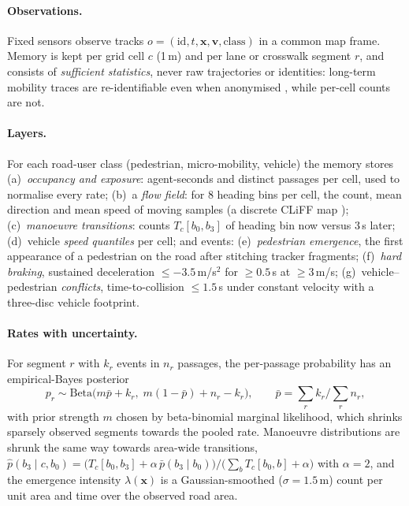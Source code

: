 \documentclass[11pt,a4paper]{article}
\begin{document}
\paragraph{Observations.}
Fixed sensors observe tracks $o=(\text{id}, t, \mathbf{x}, \mathbf{v}, \text{class})$ in a common map frame.
Memory is kept per grid cell $c$ (1\,m) and per lane or crosswalk segment $r$, and consists of \emph{sufficient statistics}, never raw trajectories or identities: long-term mobility traces are re-identifiable even when anonymised \citep{demontjoye2013unique}, while per-cell counts are not.

\paragraph{Layers.}
For each road-user class (pedestrian, micro-mobility, vehicle) the memory stores
(a)~\emph{occupancy and exposure}: agent-seconds and distinct passages per cell, used to normalise every rate;
(b)~a \emph{flow field}: for 8 heading bins per cell, the count, mean direction and mean speed of moving samples (a discrete CLiFF map \citep{zhu2023cliff});
(c)~\emph{manoeuvre transitions}: counts $T_c[b_0,b_3]$ of heading bin now versus 3\,s later;
(d)~vehicle \emph{speed quantiles} per cell;
and events:
(e)~\emph{pedestrian emergence}, the first appearance of a pedestrian on the road after stitching tracker fragments;
(f)~\emph{hard braking}, sustained deceleration $\le -3.5$\,m/s$^2$ for $\ge 0.5$\,s at $\ge 3$\,m/s;
(g)~vehicle--pedestrian \emph{conflicts}, time-to-collision \citep{hayward1972ttc} $\le 1.5$\,s under constant velocity with a three-disc vehicle footprint.

\paragraph{Rates with uncertainty.}
For segment $r$ with $k_r$ events in $n_r$ passages, the per-passage probability has an empirical-Bayes posterior
\begin{equation}
p_r \sim \mathrm{Beta}\bigl(m\bar p + k_r,\; m(1-\bar p) + n_r - k_r\bigr), \qquad \bar p = \textstyle\sum_r k_r / \sum_r n_r ,
\end{equation}
with prior strength $m$ chosen by beta-binomial marginal likelihood, which shrinks sparsely observed segments towards the pooled rate.
Manoeuvre distributions are shrunk the same way towards area-wide transitions, $\hat p(b_3\mid c,b_0) = \bigl(T_c[b_0,b_3] + \alpha\, \bar p(b_3\mid b_0)\bigr)/\bigl(\sum_b T_c[b_0,b] + \alpha\bigr)$ with $\alpha=2$, and the emergence intensity $\lambda(\mathbf{x})$ is a Gaussian-smoothed ($\sigma = 1.5$\,m) count per unit area and time over the observed road area.
\end{document}
